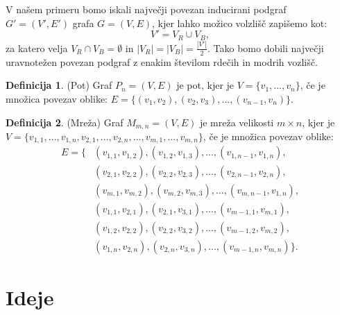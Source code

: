 \documentclass[a4paper, 11pt]{article}
\theoremstyle{definition}
\newtheorem{definicija}{Definicija}
\theoremstyle{definition}
\begin{document}
    V našem primeru bomo iskali največji povezan inducirani podgraf \\ $G' = (V', E')$ grafa $G = (V, E)$, kjer lahko možico volzlišč
    zapišemo kot: 
        $$ V' = V_{R} \cup V_{B},$$
    za katero velja $ V_{R} \cap  V_{B} = \emptyset $ in $|V_{R}| = |V_{B}| = \frac{|V'|}{2}$. Tako bomo dobili
    največji uravnotežen povezan podgraf z enakim številom rdečih in modrih vozlišč.    

    \begin{definicija} (Pot) Graf $P_n=(V,E)$ je pot, kjer je
        $V=\{ v_1,...,v_n \}$, če je množica povezav oblike:
        $E = \{ (v_1,v_2),(v_2,v_3),...,(v_{n-1},v_n) \}$.
    \end{definicija}

    \begin{definicija} 
    (Mreža) Graf $M_{m,n}=(V,E)$ je mreža velikosti $m \times n$, 
    kjer je $V=\{ v_{1,1},...,v_{1,n},v_{2,1},...,v_{2,n},...,v_{m,1},...,v_{m,n} \}$, če je množica povezav oblike:
    \begin{align*}
    E =\{ &(v_{1,1}, v_{1,2}),(v_{1,2},v_{1,3}),...,(v_{1,n-1},v_{1,n}),  \\
        &(v_{2,1}, v_{2,2}),(v_{2,2},v_{2,3}),...,(v_{2,n-1},v_{2,n}),  \\
        &(v_{m,1}, v_{m,2}),(v_{m,2},v_{m,3}),...,(v_{m,n-1},v_{1,n}), \\
        &(v_{1,1}, v_{2,1}),(v_{2,1},v_{3,1}),...,(v_{m-1,1},v_{m,1}),  \\
        &(v_{1,2}, v_{2,2}),(v_{2,2},v_{3,2}),...,(v_{m-1,2},v_{m,2}), \\
        &(v_{1,n}, v_{2,n}),(v_{2,n},v_{3,n}),...,(v_{m-1,n},v_{m,n})  \}.  
    \end{align*}
    \end{definicija}

    \section{Ideje}
\end{document}
